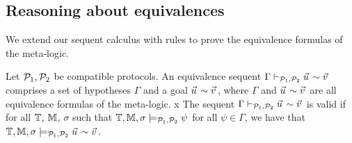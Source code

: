 


\subsection{Reasoning about equivalences}

We extend our sequent calculus with rules to prove the equivalence formulas of the meta-logic.

\begin{definition}
  Let $\mathcal{P}_1,\mathcal{P}_2$ be compatible protocols. An equivalence sequent $\Gamma \vdash_{\calp_1,\calp_2} \pvec{u} \sim \pvec{v}$ comprises a set of hypotheses $\Gamma$ and a goal $\pvec{u} \sim \pvec{v}$, where $\Gamma$ and $\pvec{u} \sim \pvec{v}$ are all equivalence formulas of the meta-logic.
x
The sequent  $\Gamma \vdash_{\calp_1,\calp_2} \pvec{u} \sim \pvec{v}$ is valid if for all $\mathbb{T}$, $\mathbb{M}$, $\sigma$ such that $\mathbb{T}, \mathbb{M}, \sigma \models_{\mathcal{P}_1,\mathcal{P}_2} \psi$ for all $\psi \in \Gamma$, we have that $\TM,\Mo,\sigma \models_{\calp_1,\calp_2}  \pvec{u} \sim \pvec{v}$.
\end{definition}

